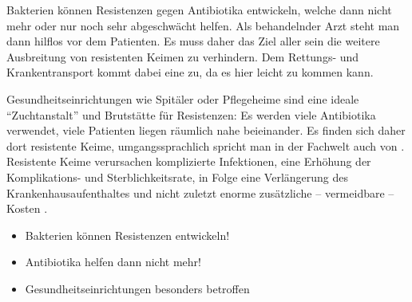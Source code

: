 {%
Bakterien können Resistenzen gegen Antibiotika entwickeln,
welche dann nicht mehr oder nur noch sehr abgeschwächt
helfen. Als behandelnder Arzt steht man dann hilflos vor dem
Patienten.
Es muss daher das Ziel aller sein die weitere Ausbreitung von
resistenten Keimen zu verhindern. Dem Rettungs- und
Krankentransport kommt dabei eine  zu, da
es hier leicht zu  kommen kann.

Gesundheitseinrichtungen wie Spitäler oder Pflegeheime sind
eine ideale \enquote{Zuchtanstalt} und Brutstätte für Resistenzen:
Es werden viele Antibiotika verwendet, viele Patienten liegen
räumlich nahe beieinander. Es finden sich daher dort
 resistente Keime, umgangssprachlich spricht man
in der Fachwelt auch von
.
Resistente Keime verursachen komplizierte Infektionen, eine
Erhöhung der Komplikations- und Sterblichkeitsrate, in Folge
eine Verlängerung des Krankenhausaufenthaltes und nicht
zuletzt enorme zusätzliche -- vermeidbare -- Kosten
\cite{Kucera2010}.
}{
\begin{itemize}
   \item Bakterien können Resistenzen entwickeln!
   \item Antibiotika helfen dann nicht mehr!
   \item Gesundheitseinrichtungen besonders betroffen
\end{itemize}
}
{}
{}
{}

\begin{Synopsis}
\end{Synopsis}

